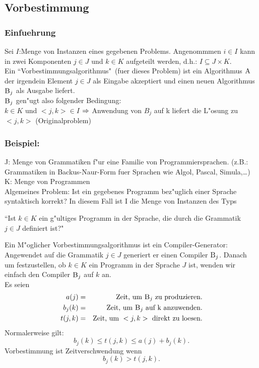 \documentclass[a4paper,twoside,DIV15,BCOR12mm]{scrbook}
\begin{document}
\subsection{Vorbestimmung}
\subsubsection*{Einfuehrung}
Sei $I$:Menge von Instanzen eines gegebenen Problems. Angenommmen $i \in I$ kann in zwei Komponenten $j \in J$ und $k \in K$ aufgeteilt werden, d.h.: $I \subseteq J \times K$.\\
Ein ``Vorbestimmungsalgorithmus"\ (fuer dieses Problem) ist ein Algorithmus $\textnormal{\scshape A}$ der irgendein Element $j\in J$ als Eingabe akzeptiert und einen neuen Algorithmus $\textnormal{\scshape B}_j$ als Ausgabe liefert. \\

$\textnormal{\scshape B}_j$ gen"ugt also folgender Bedingung:\\ 
$k\in K$ und $<j,k>\in I$ $\Rightarrow$ Anwendung von $B_j$ auf k liefert die L"osung zu $<j,k>$ (Originalproblem)\\

\subsubsection*{Beispiel:}

J: Menge von Grammatiken f"ur eine Familie von Programmiersprachen. (z.B.: Grammatiken in Backus-Naur-Form fuer Sprachen wie Algol, Pascal, Simula,\dots) \\
K: Menge von Programmen \\

Algemeines Problem: Ist ein gegebenes Programm bez"uglich einer Sprache syntaktisch korrekt? In diesem Fall ist I die Menge von Instanzen des Typs\\
\begin{center}
	 ``Ist $k \in K$ ein g"ultiges Programm in der Sprache, die durch die Grammatik $j \in J$ definiert ist?"\\
\end{center}
Ein M"oglicher Vorbestimmungsalgorithmus ist ein Compiler-Generator:\\
Angewendet auf die Grammatik $j \in J$ generiert er einen Compiler $\textnormal{\scshape B}_j$. Danach um festzustellen, ob $k\in K$ ein Programm in der Sprache $J$ ist, wenden wir einfach den Compiler $\textnormal{\scshape B}_j$ auf $k$ an.\\
Es seien 
\begin{eqnarray*}
  a(j)   & = & \text{Zeit, um }\textnormal{\scshape B}_j\text{ zu produzieren.}\\
  b_j(k)   & = & \text{Zeit, um }\textnormal{\scshape B}_j\text{ auf k anzuwenden.}\\
  t(j,k) & = & \text{Zeit, um }<j,k>\text{ direkt zu loesen.}
\end{eqnarray*}
Normalerweise gilt:
	$$b_j(k)\le t(j,k) \le a(j)+b_j(k).$$
Vorbestimmung ist Zeitverschwendung wenn $$b_j(k) > t(j,k).$$
\end{document}
